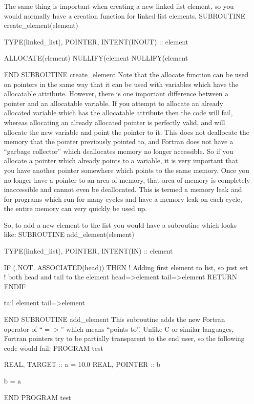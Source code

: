 \documentclass[12pt,a4paper]{article}
\newenvironment{boxverbatim}{\lboxverbatim{none}}{\endlboxverbatim}
\begin{document}
The same thing is important when creating a new linked list element, so you
would normally have a creation function for linked list elements.
\begin{boxverbatim}
SUBROUTINE create_element(element)

  TYPE(linked_list), POINTER, INTENT(INOUT) :: element

  ALLOCATE(element)
  NULLIFY(element%
  NULLIFY(element%

END SUBROUTINE create_element
\end{boxverbatim}
Note that the allocate function can be used on pointers in the same way that
it can be used with variables which have the allocatable attribute. However,
there is one important difference between a pointer and an allocatable
variable. If you attempt to allocate an already allocated variable which has
the allocatable attribute then the code will fail, whereas allocating an
already allocated pointer is perfectly valid, and will allocate the new
variable and point the pointer to it. This does not deallocate the memory that
the pointer previously pointed to, and Fortran does not have a ``garbage
collector'' which deallocates memory no longer accessible. So if you
allocate a pointer which already points to a variable, it is very important
that you have another pointer somewhere which points to the same memory. Once
you no longer have a pointer to an area of memory, that area of memory is
completely inaccessible and cannot even be deallocated. This is termed a
memory leak and for programs which run for many cycles and have a memory leak
on each cycle, the entire memory can very quickly be used up.

So, to add a new element to the list you would have a subroutine which looks
like:
\begin{boxverbatim}
SUBROUTINE add_element(element)

  TYPE(linked_list), POINTER, INTENT(IN) :: element

  IF (.NOT. ASSOCIATED(head)) THEN
    ! Adding first element to list, so just set
    ! both head and tail to the element
    head=>element
    tail=>element
    RETURN
  ENDIF

  tail%
  element%
  tail=>element

END SUBROUTINE add_element
\end{boxverbatim}
This subroutine adds the new Fortran operator of ``$=>$'' which means ``points
to''. Unlike C or similar languages, Fortran pointers try to be partially
transparent to the end user, so the following code would fail:
\begin{boxverbatim}
PROGRAM test

  REAL, TARGET :: a = 10.0
  REAL, POINTER :: b

  b = a

END PROGRAM test
\end{boxverbatim}
\end{document}
